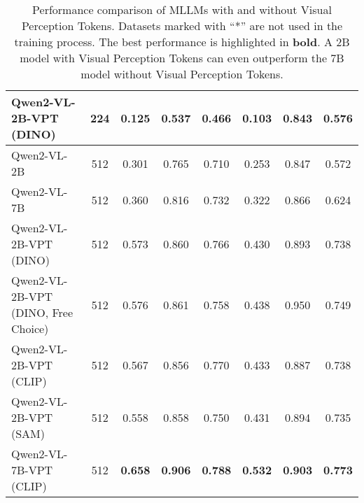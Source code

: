 \begin{table*}[t]
{\begin{tabular}{lcccccc|c}
\rowcolor{fullgreen!20} 
Qwen2-VL-2B-VPT (DINO)                      & 224                              & \textbf{0.125} & \textbf{0.537} & \textbf{0.466}                                              & \multicolumn{1}{c|}{\cellcolor{fullgreen!20}\textbf{0.103}} & \textbf{0.843} & \textbf{0.576}            \\ \midrule
Qwen2-VL-2B                                 & 512                              & 0.301          & 0.765          & 0.710                                                       & \multicolumn{1}{c|}{0.253}                                  & 0.847          & 0.572                     \\
Qwen2-VL-7B                                 & 512                              & 0.360          & 0.816 & 0.732                                              & \multicolumn{1}{c|}{0.322}                                  & 0.866          & 0.624                     \\
\rowcolor{fullgreen!20} 
Qwen2-VL-2B-VPT (DINO)                      & 512                              & 0.573 & 0.860          & 0.766                                                       & \multicolumn{1}{c|}{\cellcolor{fullgreen!20}0.430} & 0.893 & 0.738            \\ 
\rowcolor{fullgreen!20} 
Qwen2-VL-2B-VPT (DINO, Free Choice)         & 512                              & 0.576 & 0.861          & 0.758                                                       & \multicolumn{1}{c|}{\cellcolor{fullgreen!20}0.438} & 0.950 & 0.749            \\ 
\rowcolor{fullgreen!20} 
Qwen2-VL-2B-VPT (CLIP)                      & 512                              & 0.567 & 0.856          & 0.770                                                       & \multicolumn{1}{c|}{\cellcolor{fullgreen!20}0.433} & 0.887 & 0.738            \\ 
\rowcolor{fullgreen!20} 
Qwen2-VL-2B-VPT (SAM)                       & 512                              & 0.558 & 0.858          & 0.750                                                       & \multicolumn{1}{c|}{\cellcolor{fullgreen!20}0.431} & 0.894 & 0.735            \\ 
\rowcolor{fullred!20} 
Qwen2-VL-7B-VPT (CLIP)                      & 512                              & \textbf{0.658} & \textbf{0.906}          & \textbf{0.788}                                                       & \multicolumn{1}{c|}{\cellcolor{fullred!20}\textbf{0.532}} & \textbf{0.903} & \textbf{0.773}            \\ \bottomrule
\end{tabular}%
    }
    \caption{Performance comparison of MLLMs with and without Visual Perception Tokens. Datasets marked with ``*'' are not used in the training process. The best performance is highlighted in \textbf{bold}. A 2B model with Visual Perception Tokens can even outperform the 7B model without Visual Perception Tokens.}
    \label{tab:main}
\end{table*}
